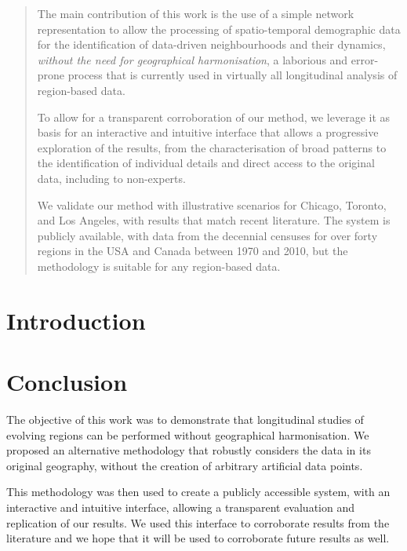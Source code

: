\documentclass[10pt,letterpaper]{article}
\begin{document}
\begin{abstract}
  The main contribution of this work is the use of a simple network representation
  to allow the processing of spatio-temporal demographic data for the
  identification of data-driven neighbourhoods and their dynamics, \emph{without
  the need for geographical harmonisation}, a laborious and error-prone process
  that is currently used in virtually all longitudinal analysis of region-based
  data.
    
  To allow for a transparent corroboration of our method, we leverage it as
  basis for an interactive and intuitive interface that allows a progressive
  exploration of the results, from the characterisation of broad patterns to the
  identification of individual details and direct access to the original data,
  including to non-experts. 

  
  We validate our method with illustrative scenarios for Chicago, Toronto, and
  Los Angeles, with results that match recent literature. The system is publicly
  available, with data from the decennial censuses for over forty regions in the
  USA and Canada between 1970 and 2010, but the methodology is suitable for any
  region-based data.
\end{abstract}

\section{Introduction}\label{sec:introduction}











\section{Conclusion}
The objective of this work was to demonstrate that longitudinal studies of
evolving regions can be performed without geographical harmonisation. We
proposed an alternative methodology that robustly considers the data in its
original geography, without the creation of arbitrary artificial data points.

This methodology was then used to create a publicly accessible system, with an
interactive and intuitive interface, allowing a transparent evaluation and
replication of our results. We used this interface to corroborate results from
the literature and we hope that it will be used to corroborate future results as
well. 
\end{document}
